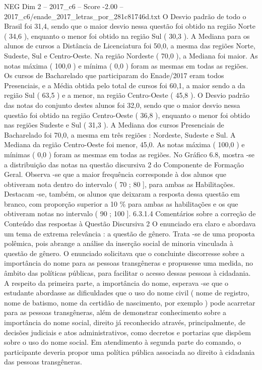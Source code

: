 \begin{textsample}{NEG Dim 2 – 2017\_c6 – Score -2.00 – 2017\_c6/enade\_2017\_letras\_por\_281c81746d.txt}
O Desvio padrão de todo o Brasil foi 31,4, sendo que o maior desvio nessa questão foi obtido na região Norte ( 34,6 ), enquanto o menor foi obtido na região Sul ( 30,3 ).
A Mediana para os alunos de cursos a Distância de Licenciatura foi 50,0, a mesma das regiões Norte, Sudeste, Sul e Centro-Oeste.
Na região Nordeste ( 70,0 ), a Mediana foi maior.
As notas máxima ( 100,0 ) e mínima ( 0,0 ) foram as mesmas em todas as regiões.
Os cursos de Bacharelado que participaram do Enade/2017 eram todos Presenciais, e a Média obtida pelo total de cursos foi 60,1, a maior sendo a da região Sul ( 63,5 ) e a menor, na região Centro-Oeste ( 45,8 ).
O Desvio padrão das notas do conjunto destes alunos foi 32,0, sendo que o maior desvio nessa questão foi obtido na região Centro-Oeste ( 36,8 ), enquanto o menor foi obtido nas regiões Sudeste e Sul ( 31,3 ).
A Mediana dos cursos Presenciais de Bacharelado foi 70,0, a mesma em três regiões : Nordeste, Sudeste e Sul.
A Mediana da região Centro-Oeste foi menor, 45,0.
As notas máxima ( 100,0 ) e mínimas ( 0,0 ) foram as mesmas em todas as regiões.
No Gráfico 6.8, mostra -se a distribuição das notas na questão discursiva 2 do Componente de Formação Geral.
Observa -se que a maior frequência corresponde à dos alunos que obtiveram nota dentro do intervalo ( 70 ; 80 ], para ambas as Habilitações.
Destacam -se, também, os alunos que deixaram a resposta dessa questão em branco, com proporção superior a 10 \% para ambas as habilitações e os que obtiveram notas no intervalo ( 90 ; 100 ]. 6.3.1.4 Comentários sobre a correção de Conteúdo das respostas à Questão Discursiva 2 O enunciado era claro e abordava um tema de extrema relevância : a questão de gênero.
Trata -se de uma proposta polêmica, pois abrange a análise da inserção social de minoria vinculada à questão de gênero.
O enunciado solicitava que o concluinte discorresse sobre a importância do nome para as pessoas transgêneras e propusesse uma medida, no âmbito das políticas públicas, para facilitar o acesso dessas pessoas à cidadania.
A respeito da primeira parte, a importância do nome, esperava -se que o estudante abordasse as dificuldades que o uso do nome civil ( nome de registro, nome de batismo, nome da certidão de nascimento, por exemplo ) pode acarretar para as pessoas transgêneras, além de demonstrar conhecimento sobre a importância do nome social, direito já reconhecido através, principalmente, de decisões judiciais e atos administrativos, como decretos e portarias que dispõem sobre o uso do nome social.
Em atendimento à segunda parte do comando, o participante deveria propor uma política pública associada ao direito à cidadania das pessoas transgêneras.

\end{textsample}
